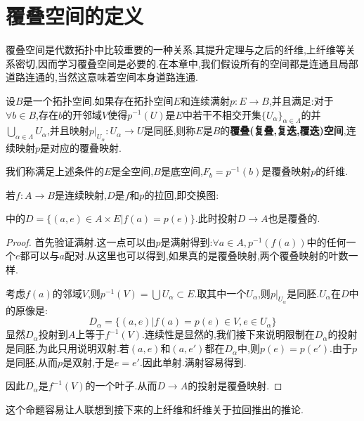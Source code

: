 \section{覆叠空间的定义}
     覆叠空间是代数拓扑中比较重要的一种关系.其提升定理与之后的纤维,上纤维等关系密切,因而学习覆叠空间是必要的.在本章中,我们假设所有的空间都是连通且局部道路连通的,当然这意味着空间本身道路连通.
\begin{definition}[覆叠空间]
    \quad

    设$B$是一个拓扑空间.如果存在拓扑空间$E$和连续满射$p:E \to B$,并且满足:对于$\forall b \in B$,存在$b$的开邻域$V$使得$p^{-1}(U)$是$E$中若干不相交开集$\{U_\alpha\}_{\alpha \in \Lambda}$的并$\bigcup_{\alpha \in \Lambda}U_\alpha$,并且映射$p|_{U_\alpha}:U_\alpha \to U$是同胚,则称$E$是$B$的\textbf{覆叠(复叠,复迭,覆迭)空间},连续映射$p$是对应的覆叠映射.

    我们称满足上述条件的$E$是全空间,$B$是底空间,$F_b=p^{-1}(b)$是覆叠映射$p$的纤维.
\end{definition}
\begin{proposition}
    若$f:A \to B$是连续映射,$D$是$f$和$p$的拉回,即交换图:
    中的$D=\{(a,e)\in A\times E|f(a)=p(e)\}$.此时投射$D \to A$也是覆叠的.
\end{proposition}
\begin{proof}
    首先验证满射.这一点可以由$p$是满射得到:$\forall a \in A,p^{-1}(f(a))$中的任何一个$e$都可以与$a$配对.从这里也可以得到,如果真的是覆叠映射,两个覆叠映射的叶数一样.

    考虑$f(a)$的邻域$V$,则$p^{-1}(V)=\bigcup U_\alpha \subset E$.取其中一个$U_\alpha$,则$p|_{U_\alpha}$是同胚.$U_\alpha$在$D$中的原像是:
    $$
    D_\alpha=\{(a,e)|f(a)=p(e) \in V, e\in U_\alpha\}
    $$
    显然$D_\alpha$投射到$A$上等于$f^{-1}(V)$.连续性是显然的,我们接下来说明限制在$D_\alpha$的投射是同胚,为此只用说明双射.若$(a,e)$和$(a,e')$都在$D_\alpha$中,则$p(e)=p(e')$.由于$p$是同胚,从而$p$是双射,于是$e=e'$.因此单射.满射容易得到.

    因此$D_\alpha$是$f^{-1}(V)$的一个叶子.从而$D \to A$的投射是覆叠映射.
\end{proof}
    这个命题容易让人联想到接下来的上纤维和纤维关于拉回推出的推论.
